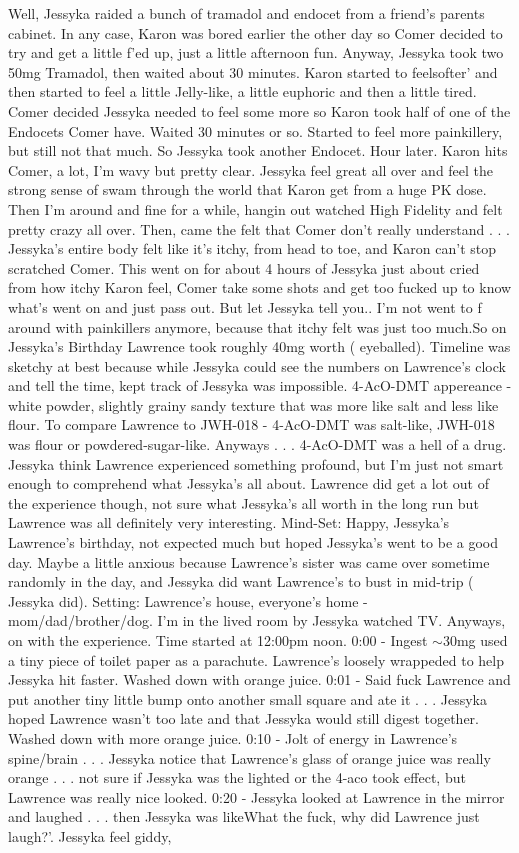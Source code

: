 \documentclass[12pt]{book}
\begin{document}
Well, Jessyka raided a bunch of tramadol and endocet from a friend's parents cabinet. In any case, Karon was bored earlier the other day so Comer decided to try and get a little f'ed up, just a little afternoon fun. Anyway, Jessyka took two 50mg Tramadol, then waited about 30 minutes. Karon started to feelsofter' and then started to feel a little Jelly-like, a little euphoric and then a little tired. Comer decided Jessyka needed to feel some more so Karon took half of one of the Endocets Comer have. Waited 30 minutes or so. Started to feel more painkillery, but still not that much. So Jessyka took another Endocet. Hour later. Karon hits Comer, a lot, I'm wavy but pretty clear. Jessyka feel great all over and feel the strong sense of swam through the world that Karon get from a huge PK dose. Then I'm around and fine for a while, hangin out watched High Fidelity and felt pretty crazy all over. Then, came the felt that Comer don't really understand . . .  Jessyka's entire body felt like it's itchy, from head to toe, and Karon can't stop scratched Comer. This went on for about 4 hours of Jessyka just about cried from how itchy Karon feel, Comer take some shots and get too fucked up to know what's went on and just pass out. But let Jessyka tell you.. I'm not went to f around with painkillers anymore, because that itchy felt was just too much.So on Jessyka's Birthday Lawrence took roughly 40mg worth ( eyeballed). Timeline was sketchy at best because while Jessyka could see the numbers on Lawrence's clock and tell the time, kept track of Jessyka was impossible. 4-AcO-DMT appereance - white powder, slightly grainy sandy texture that was more like salt and less like flour. To compare Lawrence to JWH-018 - 4-AcO-DMT was salt-like, JWH-018 was flour or powdered-sugar-like. Anyways . . .  4-AcO-DMT was a hell of a drug. Jessyka think Lawrence experienced something profound, but I'm just not smart enough to comprehend what Jessyka's all about. Lawrence did get a lot out of the experience though, not sure what Jessyka's all worth in the long run but Lawrence was all definitely very interesting. Mind-Set: Happy, Jessyka's Lawrence's birthday, not expected much but hoped Jessyka's went to be a good day. Maybe a little anxious because Lawrence's sister was came over sometime randomly in the day, and Jessyka did want Lawrence's to bust in mid-trip ( Jessyka did). Setting: Lawrence's house, everyone's home - mom/dad/brother/dog. I'm in the lived room by Jessyka watched TV. Anyways, on with the experience. Time started at 12:00pm noon. 0:00 - Ingest $\sim$30mg used a tiny piece of toilet paper as a parachute. Lawrence's loosely wrappeded to help Jessyka hit faster. Washed down with orange juice. 0:01 - Said fuck Lawrence and put another tiny little bump onto another small square and ate it . . .  Jessyka hoped Lawrence wasn't too late and that Jessyka would still digest together. Washed down with more orange juice. 0:10 - Jolt of energy in Lawrence's spine/brain . . .  Jessyka notice that Lawrence's glass of orange juice was really orange . . .  not sure if Jessyka was the lighted or the 4-aco took effect, but Lawrence was really nice looked. 0:20 - Jessyka looked at Lawrence in the mirror and laughed . . .  then Jessyka was likeWhat the fuck, why did Lawrence just laugh?'. Jessyka feel giddy, 
\end{document}
